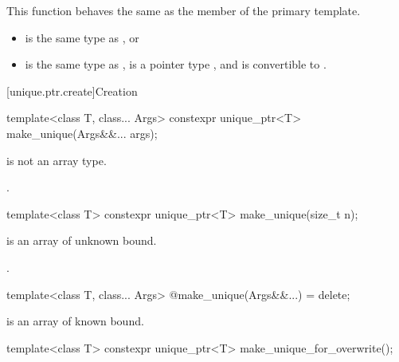 \begin{itemdescr}
\pnum
This function behaves the same as
the  member of the primary template.

\pnum
\constraints
\begin{itemize}
\item {} is the same type as , or
\item {} is the same type as ,
       is a pointer type , and
       is convertible to .
\end{itemize}
\end{itemdescr}

[unique.ptr.create]{Creation}

%
\begin{itemdecl}
template<class T, class... Args> constexpr unique_ptr<T> make_unique(Args&&... args);
\end{itemdecl}

\begin{itemdescr}
\pnum
\constraints
{} is not an array type.

\pnum
\returns
{}.

\end{itemdescr}

%
\begin{itemdecl}
template<class T> constexpr unique_ptr<T> make_unique(size_t n);
\end{itemdecl}

\begin{itemdescr}
\pnum
\constraints
{} is an array of unknown bound.

\pnum
\returns
{}.

\end{itemdescr}

%
\begin{itemdecl}
template<class T, class... Args> @\unspec@ make_unique(Args&&...) = delete;
\end{itemdecl}

\begin{itemdescr}
\pnum
\constraints
{} is an array of known bound.

\end{itemdescr}

%
\begin{itemdecl}
template<class T> constexpr unique_ptr<T> make_unique_for_overwrite();
\end{itemdecl}

